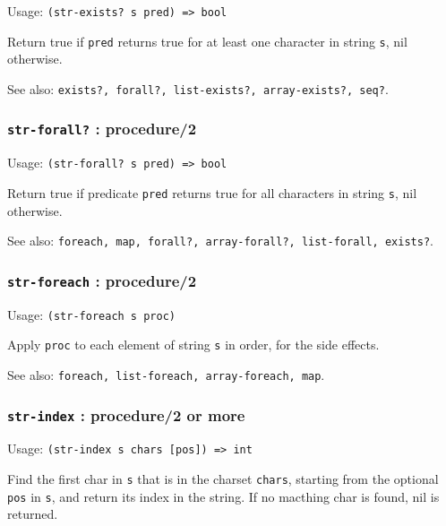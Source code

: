 \documentclass[
]{article}
\newcommand{\passthrough}[1]{#1}
\begin{document}
Usage: \passthrough{\lstinline!(str-exists? s pred) => bool!}

Return true if \passthrough{\lstinline!pred!} returns true for at least
one character in string \passthrough{\lstinline!s!}, nil otherwise.

See also:
\passthrough{\lstinline!exists?, forall?, list-exists?, array-exists?, seq?!}.

\hypertarget{str-forall-procedure2}{%
\subsubsection{\texorpdfstring{\texttt{str-forall?} :
procedure/2}{str-forall? : procedure/2}}\label{str-forall-procedure2}}

Usage: \passthrough{\lstinline!(str-forall? s pred) => bool!}

Return true if predicate \passthrough{\lstinline!pred!} returns true for
all characters in string \passthrough{\lstinline!s!}, nil otherwise.

See also:
\passthrough{\lstinline!foreach, map, forall?, array-forall?, list-forall, exists?!}.

\hypertarget{str-foreach-procedure2}{%
\subsubsection{\texorpdfstring{\texttt{str-foreach} :
procedure/2}{str-foreach : procedure/2}}\label{str-foreach-procedure2}}

Usage: \passthrough{\lstinline!(str-foreach s proc)!}

Apply \passthrough{\lstinline!proc!} to each element of string
\passthrough{\lstinline!s!} in order, for the side effects.

See also:
\passthrough{\lstinline!foreach, list-foreach, array-foreach, map!}.

\hypertarget{str-index-procedure2-or-more}{%
\subsubsection{\texorpdfstring{\texttt{str-index} : procedure/2 or
more}{str-index : procedure/2 or more}}\label{str-index-procedure2-or-more}}

Usage: \passthrough{\lstinline!(str-index s chars [pos]) => int!}

Find the first char in \passthrough{\lstinline!s!} that is in the
charset \passthrough{\lstinline!chars!}, starting from the optional
\passthrough{\lstinline!pos!} in \passthrough{\lstinline!s!}, and return
its index in the string. If no macthing char is found, nil is returned.
\end{document}
